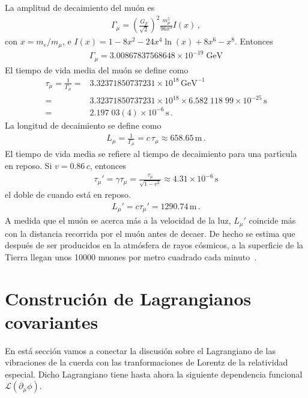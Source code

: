 \begin{example}
  La amplitud de decaimiento del mu\'on es
    \begin{align}
      \Gamma_\mu=\left(\frac{G_F}{\sqrt{2}}\right)^2\frac{m_\mu^5}{96\pi^3}I\left(x\right)\,,
    \end{align}
    con $x=m_e/m_\mu$, e $I(x)=1-8x^2-24x^4\ln(x)+8x^6-x^8$.
    Entonces
    \begin{align}
      \Gamma_\mu=3.00867837568648 \times 10^{- 19} \; \text{GeV}
    \end{align}
    El tiempo de vida media del mu\'on se define como
    \begin{align}
      \tau_\mu=\frac{1}{\Gamma_\mu}=&3.32371850737231\times10^{18}\,\text{GeV}^{-1}\nonumber\\
      =&3.32371850737231\times10^{18}\times6.582\;118\;99\times10^{-25}\,\text{s}\nonumber\\
      =&2.197\;03(4)\times10^{-6}\,\text{s}\,.
    \end{align}
La longitud de decaimiento se define como
\begin{align}
  L_\mu=\frac{1}{\Gamma_\mu}=c\,\tau_\mu\approx658.65\,\text{m}\,.
\end{align}
El tiempo de vida media se refiere al tiempo de decaimiento para una part\'\i cula en reposo. Si $v=0.86\,c$, entonces
\begin{align}
  \tau_\mu'=\gamma\tau_\mu=\frac{\tau_\mu}{\sqrt{1-v^2}}\approx4.31\times10^{-6}\,\text{s}
\end{align}
el doble de cuando est\'a en reposo. 
\begin{align}
  L_\mu'=c\tau_\mu'=1290.74\,\text{m}\,.
\end{align}
A medida que el mu\'on se acerca m\'as a la velocidad de la luz, $L_\mu'$ coincide m\'as con la distancia recorrida por el mu\'on antes de decaer. De hecho se estima que despu\'es de ser producidos en la atm\'osfera de rayos c\'osmicos, a la superficie de la Tierra llegan unos 10000 muones por metro cuadrado cada minuto~\cite{muon}.
\end{example}


\section{Construción de Lagrangianos covariantes}

En está sección vamos a conectar la discusión sobre el Lagrangiano de las vibraciones de la cuerda con las tranformaciones de Lorentz de la relatividad especial. Dicho Lagrangiano tiene hasta ahora la siguiente dependencia funcional $\mathcal{L}(\partial_{\mu}\phi)$.

